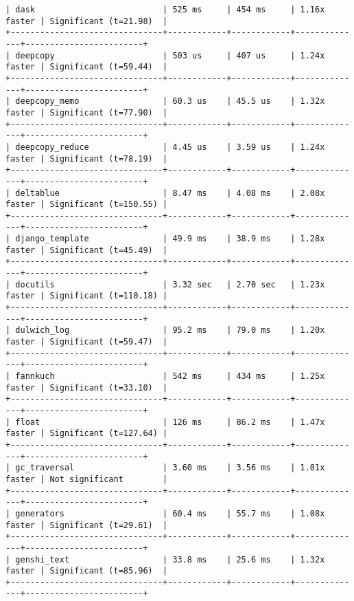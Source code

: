 \begin{code}
\begin{verbatim}
| dask                          | 525 ms     | 454 ms     | 1.16x faster | Significant (t=21.98)  |
+-------------------------------+------------+------------+--------------+------------------------+
| deepcopy                      | 503 us     | 407 us     | 1.24x faster | Significant (t=59.44)  |
+-------------------------------+------------+------------+--------------+------------------------+
| deepcopy_memo                 | 60.3 us    | 45.5 us    | 1.32x faster | Significant (t=77.90)  |
+-------------------------------+------------+------------+--------------+------------------------+
| deepcopy_reduce               | 4.45 us    | 3.59 us    | 1.24x faster | Significant (t=78.19)  |
+-------------------------------+------------+------------+--------------+------------------------+
| deltablue                     | 8.47 ms    | 4.08 ms    | 2.08x faster | Significant (t=150.55) |
+-------------------------------+------------+------------+--------------+------------------------+
| django_template               | 49.9 ms    | 38.9 ms    | 1.28x faster | Significant (t=45.49)  |
+-------------------------------+------------+------------+--------------+------------------------+
| docutils                      | 3.32 sec   | 2.70 sec   | 1.23x faster | Significant (t=110.18) |
+-------------------------------+------------+------------+--------------+------------------------+
| dulwich_log                   | 95.2 ms    | 79.0 ms    | 1.20x faster | Significant (t=59.47)  |
+-------------------------------+------------+------------+--------------+------------------------+
| fannkuch                      | 542 ms     | 434 ms     | 1.25x faster | Significant (t=33.10)  |
+-------------------------------+------------+------------+--------------+------------------------+
| float                         | 126 ms     | 86.2 ms    | 1.47x faster | Significant (t=127.64) |
+-------------------------------+------------+------------+--------------+------------------------+
| gc_traversal                  | 3.60 ms    | 3.56 ms    | 1.01x faster | Not significant        |
+-------------------------------+------------+------------+--------------+------------------------+
| generators                    | 60.4 ms    | 55.7 ms    | 1.08x faster | Significant (t=29.61)  |
+-------------------------------+------------+------------+--------------+------------------------+
| genshi_text                   | 33.8 ms    | 25.6 ms    | 1.32x faster | Significant (t=85.96)  |
+-------------------------------+------------+------------+--------------+------------------------+

\end{verbatim}
\end{code}
